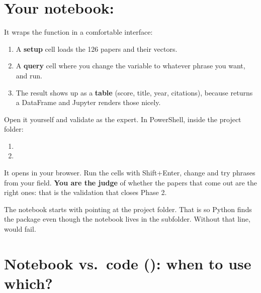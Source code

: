 \documentclass[11pt,a4paper]{article}
\begin{document}
\section{Your notebook: }

It wraps the  function in a comfortable interface:
\begin{enumerate}
  \item A \textbf{setup} cell loads the 126 papers and their vectors.
  \item A \textbf{query} cell where you change the  variable to whatever
        phrase you want, and run.
  \item The result shows up as a \textbf{table} (score, title, year, citations), because
         returns a DataFrame and Jupyter renders those nicely.
\end{enumerate}

\begin{practica}
Open it yourself and validate as the expert. In PowerShell, inside the project folder:
\begin{enumerate}
  \item {}
  \item {}
\end{enumerate}
It opens in your browser. Run the cells with Shift+Enter, change  and try
phrases from your field. \textbf{You are the judge} of whether the papers that come out are
the right ones: that is the validation that closes Phase 2.
\end{practica}

\begin{ojo}
The notebook starts with  pointing at the project folder. That is
so Python finds the  package even though the notebook lives in the
 subfolder. Without that line,  would
fail.
\end{ojo}

\section{Notebook vs.\ code (): when to use which?}
\end{document}
